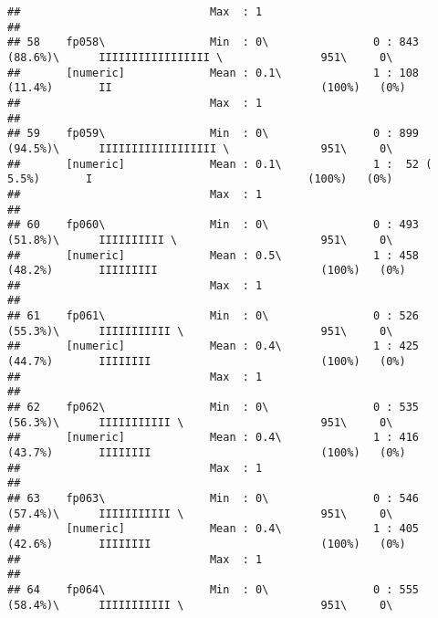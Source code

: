 \documentclass[]{article}
\begin{document}
\begin{verbatim}
##                             Max  : 1                                                                                           
## 
## 58    fp058\                Min  : 0\                0 : 843 (88.6%)\      IIIIIIIIIIIIIIIII \               951\     0\       
##       [numeric]             Mean : 0.1\              1 : 108 (11.4%)       II                                (100%)   (0%)     
##                             Max  : 1                                                                                           
## 
## 59    fp059\                Min  : 0\                0 : 899 (94.5%)\      IIIIIIIIIIIIIIIIII \              951\     0\       
##       [numeric]             Mean : 0.1\              1 :  52 ( 5.5%)       I                                 (100%)   (0%)     
##                             Max  : 1                                                                                           
## 
## 60    fp060\                Min  : 0\                0 : 493 (51.8%)\      IIIIIIIIII \                      951\     0\       
##       [numeric]             Mean : 0.5\              1 : 458 (48.2%)       IIIIIIIII                         (100%)   (0%)     
##                             Max  : 1                                                                                           
## 
## 61    fp061\                Min  : 0\                0 : 526 (55.3%)\      IIIIIIIIIII \                     951\     0\       
##       [numeric]             Mean : 0.4\              1 : 425 (44.7%)       IIIIIIII                          (100%)   (0%)     
##                             Max  : 1                                                                                           
## 
## 62    fp062\                Min  : 0\                0 : 535 (56.3%)\      IIIIIIIIIII \                     951\     0\       
##       [numeric]             Mean : 0.4\              1 : 416 (43.7%)       IIIIIIII                          (100%)   (0%)     
##                             Max  : 1                                                                                           
## 
## 63    fp063\                Min  : 0\                0 : 546 (57.4%)\      IIIIIIIIIII \                     951\     0\       
##       [numeric]             Mean : 0.4\              1 : 405 (42.6%)       IIIIIIII                          (100%)   (0%)     
##                             Max  : 1                                                                                           
## 
## 64    fp064\                Min  : 0\                0 : 555 (58.4%)\      IIIIIIIIIII \                     951\     0\       

\end{verbatim}
\end{document}
